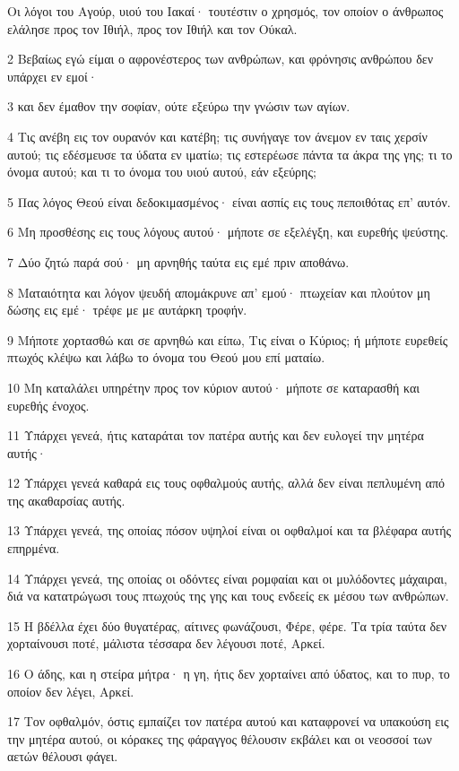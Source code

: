 \par Οι λόγοι του Αγούρ, υιού του Ιακαί· τουτέστιν ο χρησμός, τον οποίον ο άνθρωπος ελάλησε προς τον Ιθιήλ, προς τον Ιθιήλ και τον Ούκαλ.
\par 2 Βεβαίως εγώ είμαι ο αφρονέστερος των ανθρώπων, και φρόνησις ανθρώπου δεν υπάρχει εν εμοί·
\par 3 και δεν έμαθον την σοφίαν, ούτε εξεύρω την γνώσιν των αγίων.
\par 4 Τις ανέβη εις τον ουρανόν και κατέβη; τις συνήγαγε τον άνεμον εν ταις χερσίν αυτού; τις εδέσμευσε τα ύδατα εν ιματίω; τις εστερέωσε πάντα τα άκρα της γης; τι το όνομα αυτού; και τι το όνομα του υιού αυτού, εάν εξεύρης;
\par 5 Πας λόγος Θεού είναι δεδοκιμασμένος· είναι ασπίς εις τους πεποιθότας επ' αυτόν.
\par 6 Μη προσθέσης εις τους λόγους αυτού· μήποτε σε εξελέγξη, και ευρεθής ψεύστης.
\par 7 Δύο ζητώ παρά σού· μη αρνηθής ταύτα εις εμέ πριν αποθάνω.
\par 8 Ματαιότητα και λόγον ψευδή απομάκρυνε απ' εμού· πτωχείαν και πλούτον μη δώσης εις εμέ· τρέφε με με αυτάρκη τροφήν.
\par 9 Μήποτε χορτασθώ και σε αρνηθώ και είπω, Τις είναι ο Κύριος; ή μήποτε ευρεθείς πτωχός κλέψω και λάβω το όνομα του Θεού μου επί ματαίω.
\par 10 Μη καταλάλει υπηρέτην προς τον κύριον αυτού· μήποτε σε καταρασθή και ευρεθής ένοχος.
\par 11 Υπάρχει γενεά, ήτις καταράται τον πατέρα αυτής και δεν ευλογεί την μητέρα αυτής·
\par 12 Υπάρχει γενεά καθαρά εις τους οφθαλμούς αυτής, αλλά δεν είναι πεπλυμένη από της ακαθαρσίας αυτής.
\par 13 Υπάρχει γενεά, της οποίας πόσον υψηλοί είναι οι οφθαλμοί και τα βλέφαρα αυτής επηρμένα.
\par 14 Υπάρχει γενεά, της οποίας οι οδόντες είναι ρομφαίαι και οι μυλόδοντες μάχαιραι, διά να κατατρώγωσι τους πτωχούς της γης και τους ενδεείς εκ μέσου των ανθρώπων.
\par 15 Η βδέλλα έχει δύο θυγατέρας, αίτινες φωνάζουσι, Φέρε, φέρε. Τα τρία ταύτα δεν χορταίνουσι ποτέ, μάλιστα τέσσαρα δεν λέγουσι ποτέ, Αρκεί.
\par 16 Ο άδης, και η στείρα μήτρα· η γη, ήτις δεν χορταίνει από ύδατος, και το πυρ, το οποίον δεν λέγει, Αρκεί.
\par 17 Τον οφθαλμόν, όστις εμπαίζει τον πατέρα αυτού και καταφρονεί να υπακούση εις την μητέρα αυτού, οι κόρακες της φάραγγος θέλουσιν εκβάλει και οι νεοσσοί των αετών θέλουσι φάγει.
